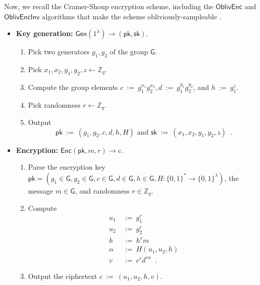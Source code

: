 \documentclass[11pt,letterpaper]{article}
\theoremstyle{plain} %
\theoremstyle{definition} %
\theoremstyle{remark} %
\newcommand{\eqdef}{\ {:=} \ }
\newcommand{\SecParam}{\lambda}
\newcommand{\Gen}{\mathsf{Gen}}
\newcommand{\Enc}{\mathsf{Enc}}
\newcommand{\OblivEnc}{\mathsf{OblivEnc}}
\newcommand{\OblivEncInv}{\mathsf{OblivEncInv}}
\newcommand{\EncKey}{\mathsf{pk}}
\newcommand{\DecKey}{\mathsf{sk}}
\newcommand{\Msg}{m}
\newcommand{\Ciphertext}{c}
\newcommand{\Rand}{r}
\newcommand{\Bits}{\{0,1\}}
\newcommand{\Integers}{\mathbb{Z}}
\newcommand{\Group}{\mathsf{G}}
\newcommand{\GrpOrd}{q}
\newcommand{\GrpEltC}{c}
\newcommand{\GrpEltD}{d}
\newcommand{\GrpEltE}{h}
\newcommand{\GrpEltH}{h}
\newcommand{\GrpEltU}{u}
\newcommand{\GrpEltV}{v}
\newcommand{\Generator}{g}
\newcommand{\Hash}{H}
\newcommand{\ExpX}{x}
\newcommand{\ExpY}{y}
\newcommand{\ExpZ}{z}
\newcommand{\Tag}{\alpha}
\begin{document}
Now, we recall the Cramer-Shoup encryption scheme, including the $\OblivEnc$ and $\OblivEncInv$ algorithms that make the scheme obliviously-sampleable \cite{CanettiF01}.
\begin{itemize}[nolistsep]
    \item \textbf{Key generation:} $\Gen(1^{\SecParam}) \to (\EncKey, \DecKey)$.
    \begin{enumerate}[nolistsep]
        \item Pick two generators $\Generator_1, \Generator_2$ of the group $\Group$.
        \item Pick $\ExpX_1, \ExpX_2, \ExpY_1, \ExpY_2, \ExpZ \gets \Integers_{\GrpOrd}$.
        \item Compute the group elements $\GrpEltC \eqdef \Generator_1^{\ExpX_1}\Generator_2^{\ExpX_2}, \GrpEltD \eqdef \Generator_1^{\ExpY_1}\Generator_2^{\ExpY_2}$, and $\GrpEltH \eqdef \Generator_1^{\ExpZ}$.
        \item Pick randomness $\Rand \gets \Integers_{\GrpOrd}$.
        \item Output
        \begin{equation*}
            \EncKey \eqdef (\Generator_1, \Generator_2, \GrpEltC, \GrpEltD, \GrpEltH, \Hash)
            \textrm{ and }
            \DecKey \eqdef (\ExpX_1, \ExpX_2, \ExpY_1, \ExpY_2, \ExpZ)
            \enspace.
        \end{equation*}
    \end{enumerate}

    \item \textbf{Encryption:} $\Enc(\EncKey, \Msg, \Rand) \to \Ciphertext$.
    \begin{enumerate}[nolistsep]
        \item Parse the encryption key $\EncKey = (\Generator_1 \in \Group, \Generator_2 \in \Group, \GrpEltC\in \Group, \GrpEltD\in \Group, \GrpEltH\in \Group, \Hash \colon \Bits^{*} \to \Bits^{\SecParam})$, the message $\Msg \in \Group$, and randomness $\Rand \in \Integers_{\GrpOrd}$.
        \item Compute
        \begin{align*}
            \GrpEltU_1 &\eqdef \Generator_1^{\Rand}\\
            \GrpEltU_2 &\eqdef \Generator_2^{\Rand}\\
            \GrpEltE &\eqdef \GrpEltH^{\Rand}\Msg\\
            \Tag &\eqdef \Hash(\GrpEltU_1, \GrpEltU_2, \GrpEltE)\\
            \GrpEltV &\eqdef \GrpEltC^{\Rand}\GrpEltD^{\Rand\Tag}
            \enspace.
        \end{align*}
        \item Output the ciphertext $\Ciphertext \eqdef (\GrpEltU_1, \GrpEltU_2, \GrpEltE, \GrpEltV)$.
    \end{enumerate}


\end{itemize}
\end{document}
